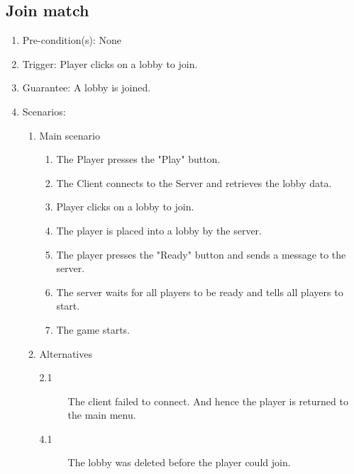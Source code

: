 \documentclass[a4paper,twoside,11pt]{article}
\begin{document}
\subsection*{Join match}
\begin{enumerate}
\item Pre-condition(s): None
\item Trigger: Player clicks on a lobby to join.
\item Guarantee: A lobby is joined.
\item Scenarios: 
	\begin{enumerate}
	\item Main scenario
		\begin{enumerate}[1)]
		\item The Player presses the "Play" button.
		\item The Client connects to the Server and retrieves the lobby data.
		\item Player clicks on a lobby to join.
		\item The player is placed into a lobby by the server.
		\item The player presses the "Ready" button and sends a message to the server.
		\item The server waits for all players to be ready and tells all players to start.
		\item The game starts.
		\end{enumerate}
	\item Alternatives
		\begin{description}		
		\item[2.1] The client failed to connect. And hence the player is returned to the main menu.
		\item[4.1] The lobby was deleted before the player could join.
		\end{description}
	\end{enumerate}
\end{enumerate}
\end{document}
